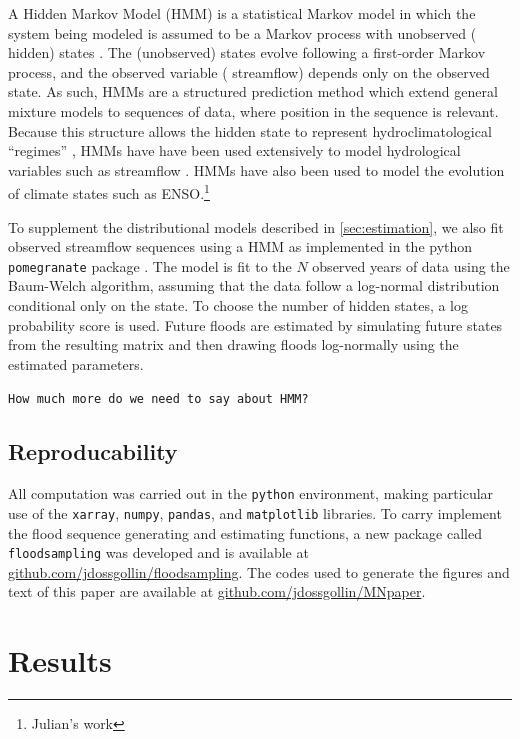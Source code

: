 \documentclass[12pt]{article}
\begin{document}
A Hidden Markov Model (HMM) is a statistical Markov model in which the system being modeled is assumed to be a Markov process with unobserved (\ie{} hidden) states \citep{Rabiner1986}.
The (unobserved) states evolve following a first-order Markov process, and the observed variable (\ie{} streamflow) depends only on the observed state.
As such, HMMs are a structured prediction method which extend general mixture models to sequences of data, where position in the sequence is relevant.
Because this structure allows the hidden state to represent hydroclimatological ``regimes'' \citep{Reinhold1982,Michelangeli1995,Merz2014}, HMMs have have been used extensively to model hydrological variables such as streamflow \citep{Bracken2016}.
HMMs have also been used to model the evolution of climate states such as ENSO.\footnote{Julian's work}

To supplement the distributional models described in \cref{sec:estimation}, we also fit observed streamflow sequences using a HMM as implemented in the python \texttt{pomegranate} package \citep{Schreiber2016}.
The model is fit to the \(N\) observed years of data using the Baum-Welch algorithm, assuming that the data follow a log-normal distribution conditional only on the state.
To choose the number of hidden states, a log probability score is used.
Future floods are estimated by simulating future states from the resulting matrix and then drawing floods log-normally using the estimated parameters.

\texttt{How much more do we need to say about HMM?}

\subsection{Reproducability}

All computation was carried out in the \texttt{python} environment, making particular use of the \texttt{xarray}, \texttt{numpy}, \texttt{pandas}, and \texttt{matplotlib} libraries.
To carry implement the flood sequence generating and estimating functions, a new package called \texttt{floodsampling} was developed and is available at \url{github.com/jdossgollin/floodsampling}.
The codes used to generate the figures and text of this paper are available at \url{github.com/jdossgollin/MNpaper}.

\section{Results}
\end{document}
